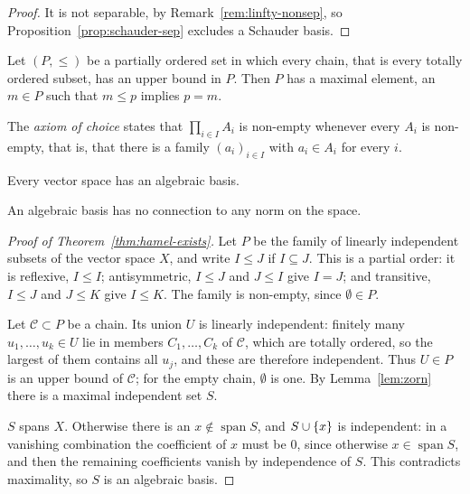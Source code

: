 \begin{proof}
It is not separable, by Remark~\ref{rem:linfty-nonsep}, so
Proposition~\ref{prop:schauder-sep} excludes a Schauder basis.
\end{proof}

\begin{lemma}[Zorn]\label{lem:zorn}
Let $(P, \le)$ be a partially ordered set in which every chain, that is every
totally ordered subset, has an upper bound in $P$. Then $P$ has a maximal
element, an $m \in P$ such that $m \le p$ implies $p = m$.
\end{lemma}

\begin{remark}
The \emph{axiom of choice} states that $\prod_{i \in I} A_i$ is non-empty
whenever every $A_i$ is non-empty, that is, that there is a family
$(a_i)_{i \in I}$ with $a_i \in A_i$ for every $i$.
\end{remark}

\begin{theorem}\label{thm:hamel-exists}
Every vector space has an algebraic basis.
\end{theorem}

\begin{remark}
An algebraic basis has no connection to any norm on the space.
\end{remark}

\begin{proof}[Proof of Theorem~\ref{thm:hamel-exists}]
Let $P$ be the family of linearly independent subsets of the vector space
$X$, and write $I \le J$ if $I \subseteq J$. This is a partial order: it is
reflexive, $I \le I$; antisymmetric, $I \le J$ and $J \le I$ give $I = J$;
and transitive, $I \le J$ and $J \le K$ give $I \le K$. The family is
non-empty, since $\emptyset \in P$.

Let $\mathcal{C} \subset P$ be a chain. Its union $U$ is linearly
independent: finitely many $u_1, \dots, u_k \in U$ lie in members
$C_1, \dots, C_k$ of $\mathcal{C}$, which are totally ordered, so the largest
of them contains all $u_j$, and these are therefore independent. Thus
$U \in P$ is an upper bound of $\mathcal{C}$; for the empty chain,
$\emptyset$ is one. By Lemma~\ref{lem:zorn} there is a maximal independent
set $S$.

$S$ spans $X$. Otherwise there is an $x \notin \operatorname{span} S$, and
$S \cup \{x\}$ is independent: in a vanishing combination the coefficient
of $x$ must be $0$, since otherwise $x \in \operatorname{span} S$, and then
the remaining coefficients vanish by independence of $S$. This contradicts
maximality, so $S$ is an algebraic basis.
\end{proof}

